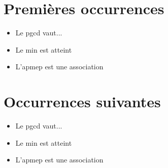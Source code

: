 \documentclass[french]{article}
\begin{document}
 

\section{Premières occurrences} 

\begin{itemize} 
\item Le \gls{pgcd} vaut... 
\item Le \gls{min} est atteint 
\item L'\gls{apmep} est une association 
\end{itemize} 

\section{Occurrences suivantes} 

\begin{itemize} 
\item Le \gls{pgcd} vaut... 
\item Le \gls{min} est atteint 
\item L'\gls{apmep} est une association 
\end{itemize} 

\printglossary 
\end{document}
